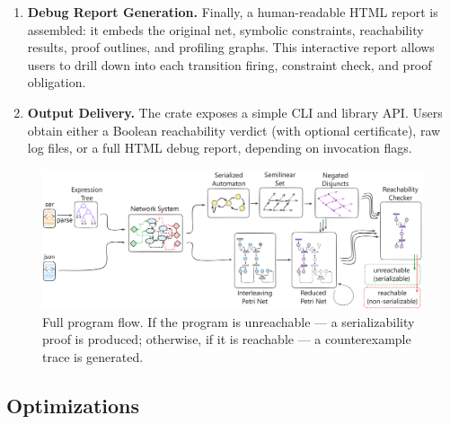 \begin{enumerate}
	\item \textbf{Debug Report Generation.} Finally, a human-readable HTML report is assembled: it embeds the original net, symbolic constraints, reachability results, proof outlines, and profiling graphs. This interactive report allows users to drill down into each transition firing, constraint check, and proof obligation.
	
	\item \textbf{Output Delivery.} The crate exposes a simple CLI and library API. Users obtain either a Boolean reachability verdict (with optional certificate), raw log files, or a full HTML debug report, depending on invocation flags.
\end{enumerate}



\begin{figure}[htbp]
	\centering
	\includegraphics[width=1.0\textwidth]{plots/full_program_flow.pdf}
	\caption{Full program flow. If the program is unreachable --- a serializability proof is produced; otherwise, if it is reachable --- a counterexample trace is generated.}
	\label{fig:full_program_flow}
\end{figure}


\subsection{Optimizations}

